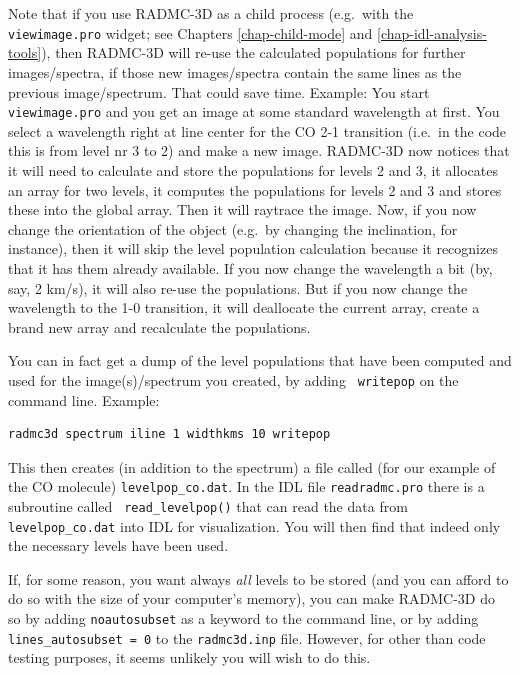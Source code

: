 \documentclass{report}
\newenvironment{asciibox}%
  {\begin{list}{}{%
    \setlength{\topsep}{0.5em}%
    \setlength{\parskip}{0em}%
    \setlength{\parsep}{0em}%
    \setlength{\itemsep}{0em}%
    \setlength{\rightmargin}{0em}%
    \setlength{\leftmargin}{3.0em}%
    \setlength{\labelsep}{1em}%
    \setlength{\labelwidth}{2em}%
  }\normalfont\footnotesize\item}
  {\end{list}}
\begin{document}
Note that if you use RADMC-3D as a child process (e.g.\ with the {\small\tt
  viewimage.pro} widget; see Chapters \ref{chap-child-mode} and
\ref{chap-idl-analysis-tools}), then RADMC-3D will re-use the calculated
populations for further images/spectra, if those new images/spectra contain
the same lines as the previous image/spectrum. That could save time.
Example: You start {\small\tt viewimage.pro} and you get an image at some
standard wavelength at first. You select a wavelength right at line center
for the CO 2-1 transition (i.e.\ in the code this is from level nr 3 to 2)
and make a new image. RADMC-3D now notices that it will need to calculate
and store the populations for levels 2 and 3, it allocates an array for two
levels, it computes the populations for levels 2 and 3 and stores these into
the global array. Then it will raytrace the image. Now, if you now change
the orientation of the object (e.g.\ by changing the inclination, for
instance), then it will skip the level population calculation because it
recognizes that it has them already available. If you now change the
wavelength a bit (by, say, 2 km/s), it will also re-use the populations. But
if you now change the wavelength to the 1-0 transition, it will deallocate
the current array, create a brand new array and recalculate the populations.

You can in fact get a dump of the level populations that have been computed
and used for the image(s)/spectrum you created, by adding {\small\tt 
writepop} on the command line. Example:
\begin{asciibox}\begin{verbatim}
radmc3d spectrum iline 1 widthkms 10 writepop
\end{verbatim}\end{asciibox}
This then creates (in addition to the spectrum) a file called (for our
example of the CO molecule) {\small\tt levelpop\_co.dat}. In the IDL file
{\small\tt readradmc.pro} there is a subroutine called {\small\tt
  read\_levelpop()} that can read the data from {\small\tt levelpop\_co.dat}
into IDL for visualization. You will then find that indeed only the
necessary levels have been used.

If, for some reason, you want always {\em all} levels to be stored (and you
can afford to do so with the size of your computer's memory), you can make
RADMC-3D do so by adding {\small\tt noautosubset} as a keyword to the
command line, or by adding {\small\tt lines\_autosubset = 0} to the
{\small\tt radmc3d.inp} file. However, for other than code testing purposes,
it seems unlikely you will wish to do this.
\end{document}
